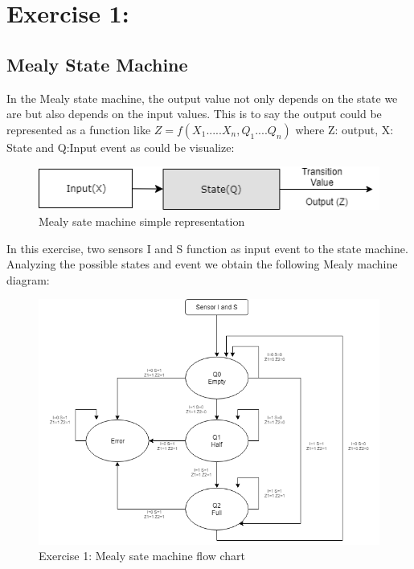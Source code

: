 



%
%
%

\section{\color{olive}Exercise 1: }

\subsection{\color{purple}Mealy State Machine}

In the Mealy state machine, the output value not only depends on the state we are but also depends on the input values. This is to say the output could be represented as a function like $Z=f(X_1.....X_n,Q_1....Q_n)$ where Z: output, X: State and Q:Input event as could be visualize:

 \begin{figure}[h!]
        \centering
        \includegraphics[scale=0.75]{Mealydiagram.png}
        \caption{\color{cyan}Mealy sate machine simple representation}
        \label{fig:ej1mealyr}
    \end{figure}

In this exercise, two sensors I and S function as input event to the state machine. Analyzing the possible states and event we obtain the following Mealy machine diagram:

 \begin{figure}[h!]
        \centering
        \includegraphics[scale=0.65]{ej1mealy.png}
        \caption{\color{cyan}Exercise 1: Mealy sate machine flow chart}
        \label{fig:ej1mealyd}
    \end{figure}

